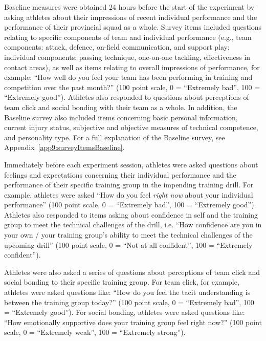 \begin{CJK}{UTF8}{gbsn}
Baseline measures were obtained 24 hours before the start of the experiment by asking athletes about their impressions of recent individual performance and the performance of their provincial squad as a whole.  Survey items included questions relating to specific components of team and individual performance (e.g., team components: attack, defence, on-field communication, and support play; individual components: passing technique, one-on-one tackling, effectiveness in contact areas), as well as items relating to overall impressions of performance, for example: ``How well do you feel your team has been performing in training and competition over the past month?'' (100 point scale, 0 = ``Extremely bad'', 100 = ``Extremely good'').  Athletes also responded to questions about perceptions of team click and social bonding with their team as a whole.  In addition, the Baseline survey also included items concerning basic personal information, current injury status, subjective and objective measures of technical competence, and personality type.  For a full explanation of the Baseline survey, see Appendix~\ref{app9:surveyItemsBaseline}.


Immediately before each experiment session, athletes were asked questions about feelings and expectations concerning their individual performance and the performance of their specific training group in the impending training drill.  For example, athletes were asked ``How do you feel \textit{right now} about your individual performance'' (100 point scale, 0 = ``Extremely bad'', 100 = ``Extremely good'').  Athletes also responded to items asking about confidence in self and the training group to meet the technical challenges of the drill, i.e. ``How confidence are you in your own / your training group's ability to meet the technical challenges of the upcoming drill'' (100 point scale, 0 = ``Not at all confident'', 100 = ``Extremely confident'').

Athletes were also asked a series of questions about perceptions of team click and social bonding to their specific training group. For team click, for example, athletes were asked questions like: ``How do you feel the tacit understanding is between the training group today?'' (100 point scale, 0 = ``Extremely bad'', 100 = ``Extremely good'').  For social bonding, athletes were asked questions like: ``How emotionally supportive does your training group feel right now?'' (100 point scale, 0 = ``Extremely weak'', 100 = ``Extremely strong'').


\end{CJK}

